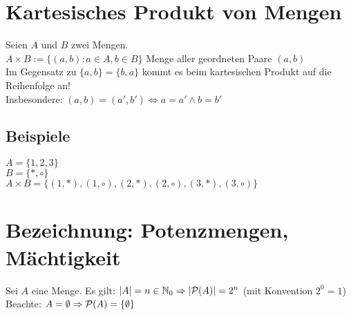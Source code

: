\newpage

\section{Kartesisches Produkt von Mengen}\label{1.6}
Seien $A$ und $B$ zwei Mengen.\\
$A \times B := \{(a,b) : a \in A , b \in B \}$ Menge aller geordneten Paare $(a,b)$\\
Im Gegensatz zu $\{a,b\}=\{b,a\}$ kommt es beim kartesischen Produkt auf die Reihenfolge an!\\
Insbesondere: $(a,b)=(a',b') \Leftrightarrow a=a' \wedge b = b'$

\subsection*{Beispiele}
$A=\{1,2,3\}$\\
$B=\{\ast,\circ\}$\\
$A \times B = \{(1,\ast),(1,\circ),(2,\ast),(2,\circ),(3,\ast),(3,\circ)\}$

\section{Bezeichnung: Potenzmengen, Mächtigkeit}\label{1.7}
Sei $A$ eine Menge.
Es gilt: $|A| = n \in \mathbb{N}_0 \Rightarrow |\mathcal{P}(A)|=2^n$ (mit Konvention $2^0=1$)\\
Beachte: $A=\emptyset \Rightarrow \mathcal{P}(A)=\{\emptyset\}$